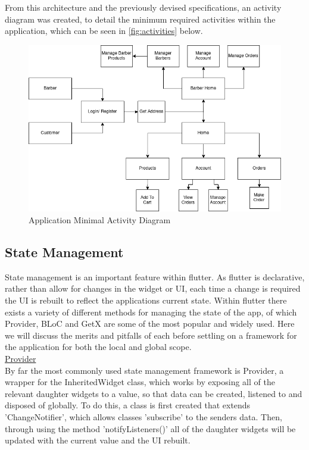 \documentclass[12pt]{article}
\begin{document}
 	From this architecture and the previously devised specifications, an activity diagram was created, to detail the minimum required activities within the application, which can be seen in \autoref{fig:activities} below.
 	
 	
 	\begin{figure}[H]
 		\centering
 		\includegraphics[scale=0.6]{images/activities.png}
 		\caption{Application Minimal Activity Diagram}
 		\label{fig:activities}
 	\end{figure}
	 
	
	\subsection{State Management}
	State management is an important feature within flutter. As flutter is declarative, rather than allow for changes in the widget or UI, each time a change is required the UI is rebuilt to reflect the applications current state. Within flutter there exists a variety of different methods for managing the state of the app, of which Provider, BLoC and GetX are some of the most popular and widely used. Here we will discuss the merits and pitfalls of each before settling on a framework for the application for both the local and global scope.
	\\
	
	\noindent \underline{Provider}
	\\
	\noindent
	By far the most commonly used state management framework is Provider, a wrapper for the InheritedWidget class, which works by exposing all of the relevant daughter widgets to a value, so that data can be created, listened to and disposed of globally. To do this, a class is first created that extends 'ChangeNotifier', which allows classes 'subscribe' to the senders data. Then, through using the method 'notifyListeners()' all of the daughter widgets will be updated with the current value and the UI rebuilt.
	
\end{document}
